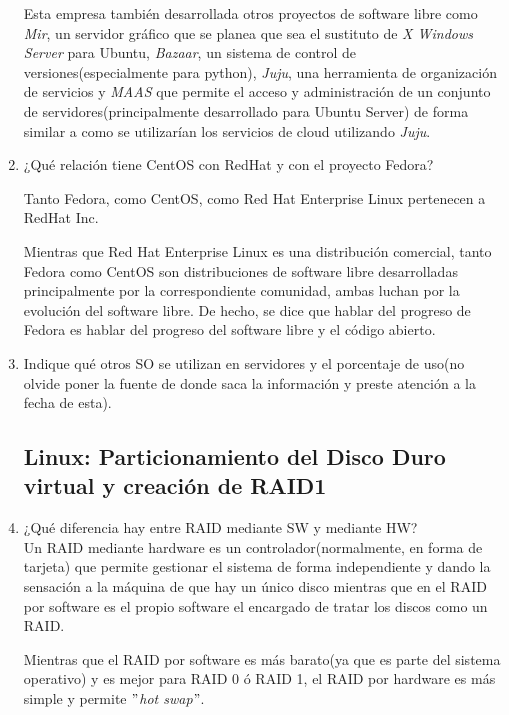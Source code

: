 \documentclass[paper=a4, fontsize=11pt]{scrartcl} %
\numberwithin{equation}{section} %
\numberwithin{figure}{section} %
\numberwithin{table}{section} %
\begin{document}
\begin{enumerate}
		Esta empresa también desarrollada otros proyectos de software libre como \textit{Mir}, un
		servidor gráfico que se planea que sea el sustituto de \textit{X Windows Server} para Ubuntu,
		\textit{Bazaar}, un sistema de control de versiones(especialmente para python), \textit{Juju},
		una herramienta de organización de servicios y \textit{MAAS}\cite{MAAS} que permite el acceso
		y administración de un conjunto de servidores(principalmente desarrollado para Ubuntu Server)
		de forma similar a como se utilizarían los servicios de cloud utilizando \textit{Juju}.
		
		\item ¿Qué relación tiene CentOS con RedHat y con el proyecto Fedora?
		
		Tanto Fedora\cite{Fedora}, como CentOS\cite{CentOS}, como Red Hat Enterprise Linux\cite{RedHat}
		pertenecen a RedHat Inc.
		
		Mientras que Red Hat Enterprise Linux es una distribución comercial, tanto Fedora como CentOS
		son distribuciones de software libre desarrolladas principalmente por la correspondiente
		comunidad, ambas luchan por la evolución del software libre. De hecho, se dice que hablar del
		progreso de Fedora es hablar del progreso del software libre y el código abierto\cite{cita}.
		
		
		\item Indique qué otros SO se utilizan en servidores y el porcentaje de uso(no olvide poner
		la fuente de donde saca la información y preste atención a la fecha de esta).
		
	\subsection{Linux: Particionamiento del Disco Duro virtual y creación de RAID1}
		\item ¿Qué diferencia hay entre RAID mediante SW y mediante HW?\\
		Un RAID mediante hardware es un controlador(normalmente, en forma de tarjeta) que permite gestionar
		el sistema de forma independiente y dando la sensación a la máquina de que hay un único disco mientras
		que en el RAID por software es el propio software el encargado de tratar los discos como un RAID.
		
		Mientras que el RAID por software es más barato(ya que es parte del sistema operativo) y es mejor
		para RAID 0 ó RAID 1, el RAID por hardware es más simple y permite \textit{$"$hot swap$"$}.
		\cite{HWvsSW}\cite{RAID_RedHat}
		

\end{enumerate}
\end{document}
